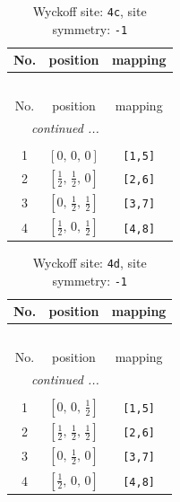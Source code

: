 \documentclass[fleqn,8pt]{jsarticle}
\begin{document}
\renewcommand{\arraystretch}{1.2}
\begin{longtable}{ccc}
\caption{Wyckoff site: {\tt 4c}, site symmetry: {\tt -1}}
 \\
 \hline \hline
No. & position & mapping \\ \hline \endfirsthead

\multicolumn{2}{l}{\tablename\ \thetable{}} \\
 \hline \hline
No. & position & mapping \\ \hline \endhead

 \hline \hline
\multicolumn{2}{r}{\footnotesize\it continued ...} \\ \endfoot

 \hline \hline
\multicolumn{2}{r}{} \\ \endlastfoot

1 & $\left[ 0,\, 0,\, 0 \right]$ & {\tt [1,5]} \\ \hline
2 & $\left[ \frac{1}{2},\, \frac{1}{2},\, 0 \right]$ & {\tt [2,6]} \\ \hline
3 & $\left[ 0,\, \frac{1}{2},\, \frac{1}{2} \right]$ & {\tt [3,7]} \\ \hline
4 & $\left[ \frac{1}{2},\, 0,\, \frac{1}{2} \right]$ & {\tt [4,8]} \\
\end{longtable}
\renewcommand{\arraystretch}{1.2}
\begin{longtable}{ccc}
\caption{Wyckoff site: {\tt 4d}, site symmetry: {\tt -1}}
 \\
 \hline \hline
No. & position & mapping \\ \hline \endfirsthead

\multicolumn{2}{l}{\tablename\ \thetable{}} \\
 \hline \hline
No. & position & mapping \\ \hline \endhead

 \hline \hline
\multicolumn{2}{r}{\footnotesize\it continued ...} \\ \endfoot

 \hline \hline
\multicolumn{2}{r}{} \\ \endlastfoot

1 & $\left[ 0,\, 0,\, \frac{1}{2} \right]$ & {\tt [1,5]} \\ \hline
2 & $\left[ \frac{1}{2},\, \frac{1}{2},\, \frac{1}{2} \right]$ & {\tt [2,6]} \\ \hline
3 & $\left[ 0,\, \frac{1}{2},\, 0 \right]$ & {\tt [3,7]} \\ \hline
4 & $\left[ \frac{1}{2},\, 0,\, 0 \right]$ & {\tt [4,8]} \\
\end{longtable}
\end{document}
